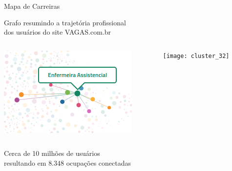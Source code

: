 \documentclass[10pt, hyperref={pdfpagelabels=false, unicode=true}, aspectratio=169]{beamer}
\begin{document}
{
\begin{frame}[c, label=mapa-de-carreiras]{Mapa de Carreiras}
  \begin{center}
    Grafo resumindo a trajetória profissional\\dos usuários do site VAGAS.com.br
    
    \begin{columns}[onlytextwidth]
      \begin{column}{0.4\textwidth}
        \centering
        \includegraphics[width=\textwidth]{mapa-enfermeira-assistencial}
      \end{column}
      
      \begin{column}{0.6\textwidth}
        \centering
        \texttt{[image: cluster\_32]}
      \end{column}
    \end{columns}

    Cerca de \alert{10 milhões} de usuários\\resultando em \alert{8.348 ocupações} conectadas
  \end{center}
\end{frame}
}
\end{document}
